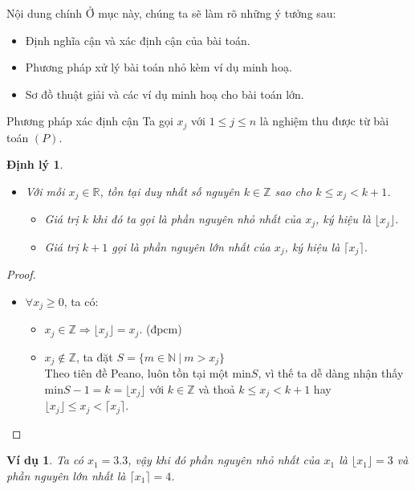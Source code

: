 \documentclass{beamer}
\newtheorem{dl}{Định lý}[section]
\newtheorem{vd}{Ví dụ}[section]
\begin{document}
\begin{frame}{Nội dung chính}
\large
Ở mục này, chúng ta sẽ làm rõ những ý tưởng sau:
\begin{itemize}
\item Định nghĩa cận và xác định cận của bài toán.
\item Phương pháp xử lý bài toán nhỏ kèm ví dụ minh hoạ.
\item Sơ đồ thuật giải và các ví dụ minh hoạ cho bài toán lớn.
\end{itemize}
\end{frame}

\begin{frame}{Phương pháp xác định cận}
Ta gọi $x_j$ với $1 \leq j \leq n$ là nghiệm thu được từ bài toán $(P)$.
\begin{dl}\label{cmnguyen}
\begin{itemize}
\item Với mỗi $x_j \in \mathbb{R}$, tồn tại duy nhất số nguyên $k \in \mathbb{Z}$ sao cho $k \leq x_j < k+1$.
\begin{itemize}
\item Giá trị $k$ khi đó ta gọi là phần nguyên nhỏ nhất của $x_j$, ký hiệu là $\lfloor x_j \rfloor$.
\item Giá trị $k+1$ gọi là phần nguyên lớn nhất của $x_j$, ký hiệu là $\lceil x_j \rceil$.
\end{itemize}
\end{itemize}
\end{dl}
\end{frame}

\begin{frame}
\begin{proof}
\begin{itemize}
\item $\forall x_j \geq 0$, ta có:
\begin{itemize}
\item $x_j \in \mathbb{Z} \Rightarrow \lfloor x_j \rfloor =x_j$. (đpcm)
\item $x_j \notin \mathbb{Z}$, ta đặt $S=\{ m \in \mathbb{N} \: \vert \: m > x_j \}$ \\ Theo tiên đề Peano, luôn tồn tại một min$S$, vì thế ta dễ dàng nhận thấy min$S -1=k=\lfloor x_j \rfloor$ với $k \in \mathbb{Z}$ và thoả $k \leq x_j < k+1$ hay $\lfloor x_j \rfloor \leq x_j <\lceil x_j \rceil$. 
\end{itemize}
\end{itemize}
\end{proof}

\begin{vd}
Ta có $x_1=3.3$, vậy khi đó phần nguyên nhỏ nhất của $x_1$ là $\lfloor x_1 \rfloor = 3$ và phần nguyên lớn nhất là $\lceil x_1 \rceil =4$.
\end{vd}
\end{frame}
\end{document}
